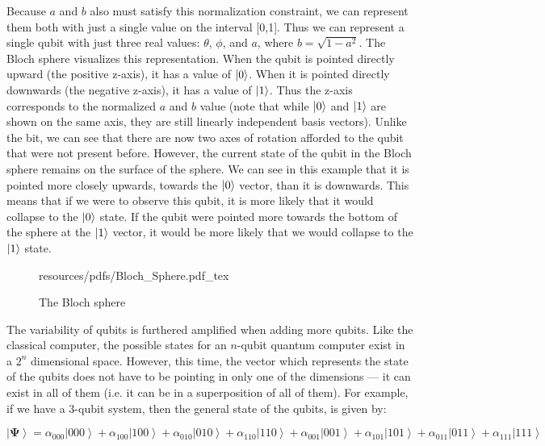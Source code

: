 \documentclass[11pt]{report}
\newcommand{\?}{\stackrel{?}{=}}
\begin{document}
Because $a$ and $b$ also must satisfy this normalization constraint, we can represent them both with just a single value on the interval [0,1]. Thus we can represent a single qubit with just three real values: $\theta$, $\phi$, and $a$, where $b = \sqrt{1 - a^2}$. The Bloch sphere visualizes this representation. When the qubit is pointed directly upward (the positive z-axis), it has a value of $\ket{0}$. When it is pointed directly downwards (the negative z-axis), it has a value of $\ket{1}$. Thus the z-axis corresponds to the normalized $a$ and $b$ value (note that while $\ket{0}$ and $\ket{1}$ are shown on the same axis, they are still linearly independent basis vectors).  Unlike the bit, we can see that there are now two axes of rotation afforded to the qubit that were not present before. However, the current state of the qubit in the Bloch sphere remains on the surface of the sphere. We can see in this example that it is pointed more closely upwards, towards the $\ket{0}$ vector, than it is downwards. This means that if we were to observe this qubit, it is more likely that it would collapse to the $\ket{0}$ state. If the qubit were pointed more towards the bottom of the sphere at the $\ket{1}$ vector, it would be more likely that we would collapse to the $\ket{1}$ state.

\begin{figure}[!h]
    \centering
    \def\svgwidth{2in}
    {resources/pdfs/Bloch_Sphere.pdf_tex}
    \caption{The Bloch sphere}
    \label{fig:awesome_image}
\end{figure}

The variability of qubits is furthered amplified when adding more qubits. Like the classical computer, the possible states for an $n$-qubit quantum computer exist in a $2^{n}$ dimensional space. However, this time, the vector which represents the state of the qubits does not have to be pointing in only one of the dimensions --- it can exist in all of them (i.e. it can be in a superposition of all of them). For example, if we have a 3-qubit system, then the general state of the qubits, is given by:

$$ \left | \mathbf{\Psi} \right \rangle=\alpha _{000}\left | 000 \right \rangle+\alpha _{100}\left | 100 \right \rangle+\alpha _{010}\left | 010 \right \rangle+\alpha _{110}\left | 110 \right 
                \rangle+\alpha _{001}\left | 001 \right \rangle+\alpha _{101}\left | 101 \right \rangle+\alpha _{011}\left | 011 \right \rangle+\alpha _{111}\left | 111 
                \right \rangle$$
                
\end{document}
